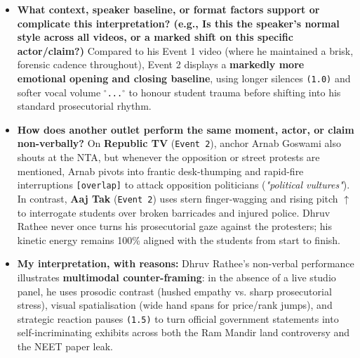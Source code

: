 \documentclass[10pt,a4paper]{article}
\begin{document}
\begin{itemize}
The non-verbal cues \textbf{dramatise and reinforce} the documentary evidence (pointing at FIRs and scorecards), \textbf{invert official assurances via sarcasm} (the \texttt{[scoff]} and circular finger gesture on NTA's inquiry committee at \texttt{[08:42]}), and \textbf{leave the accusation of top-down political orchestration unspoken via trailing off} (\texttt{...}) when discussing the \texttt{4 June} election-day release (\texttt{[05:52]}) and the Gujarat/Bihar exam mafia nexus (\texttt{[14:50]}).\par\smallskip
  \item \textbf{What context, speaker baseline, or format factors support or complicate this interpretation? (e.g., Is this the speaker's normal style across all videos, or a marked shift on this specific actor/claim?)}
Compared to his Event 1 video (where he maintained a brisk, forensic cadence throughout), Event 2 displays a \textbf{markedly more emotional opening and closing baseline}, using longer silences \texttt{(1.0)} and softer vocal volume \texttt{$^\circ$...$^\circ$} to honour student trauma before shifting into his standard prosecutorial rhythm.\par\smallskip
  \item \textbf{How does another outlet perform the same moment, actor, or claim non-verbally?}
On \textbf{Republic TV} (\texttt{Event 2}), anchor Arnab Goswami also shouts at the NTA, but whenever the opposition or street protests are mentioned, Arnab pivots into frantic desk-thumping and rapid-fire interruptions \texttt{[overlap]} to attack opposition politicians (\textit{"political vultures"}). In contrast, \textbf{Aaj Tak} (\texttt{Event 2}) uses stern finger-wagging and rising pitch \texttt{$\uparrow$} to interrogate students over broken barricades and injured police. Dhruv Rathee never once turns his prosecutorial gaze against the protesters; his kinetic energy remains 100\% aligned with the students from start to finish.\par\smallskip
  \item \textbf{My interpretation, with reasons:}
Dhruv Rathee's non-verbal performance illustrates \textbf{multimodal counter-framing}: in the absence of a live studio panel, he uses prosodic contrast (hushed empathy vs. sharp prosecutorial stress), visual spatialisation (wide hand spans for price/rank jumps), and strategic reaction pauses \texttt{(1.5)} to turn official government statements into self-incriminating exhibits across both the Ram Mandir land controversy and the NEET paper leak.\par\smallskip
\end{itemize}
\newpage
\end{document}
